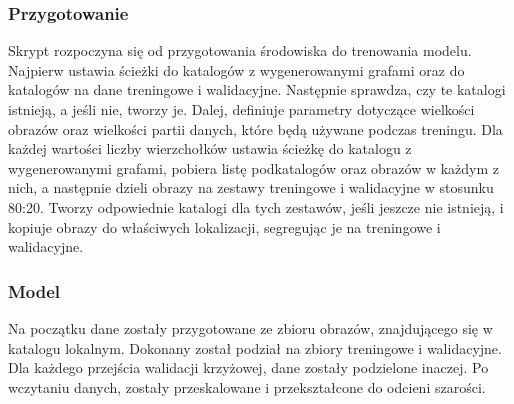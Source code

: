 \subsubsection{Przygotowanie}
Skrypt rozpoczyna się od przygotowania środowiska do trenowania modelu.
Najpierw ustawia ścieżki do katalogów z wygenerowanymi grafami oraz do katalogów na dane treningowe i walidacyjne.
Następnie sprawdza, czy te katalogi istnieją, a jeśli nie, tworzy je.
Dalej, definiuje parametry dotyczące wielkości obrazów oraz wielkości partii danych, które będą używane podczas treningu.
Dla każdej wartości liczby wierzchołków ustawia ścieżkę do katalogu z wygenerowanymi grafami,
pobiera listę podkatalogów oraz obrazów w każdym z nich,
a następnie dzieli obrazy na zestawy treningowe i walidacyjne w stosunku 80:20.
Tworzy odpowiednie katalogi dla tych zestawów, jeśli jeszcze nie istnieją,
i kopiuje obrazy do właściwych lokalizacji, segregując je na treningowe i walidacyjne.

\subsubsection{Model}
Na początku dane zostały przygotowane ze zbioru obrazów, znajdującego się w katalogu lokalnym.
Dokonany został podział na zbiory treningowe i walidacyjne.
Dla każdego przejścia walidacji krzyżowej, dane zostały podzielone inaczej.
Po wczytaniu danych, zostały przeskalowane i przekształcone do odcieni szarości.


